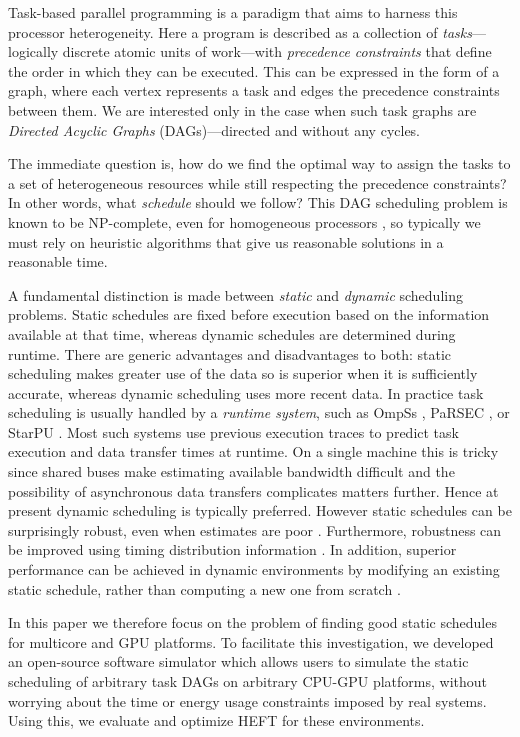 \documentclass[runningheads]{llncs}
\begin{document}
Task-based parallel programming is a paradigm that aims to harness this processor heterogeneity. Here a program is described as a collection of {\em tasks}---logically discrete atomic units of work---with {\em precedence constraints} that define the order in which they can be executed. This can be expressed in the form of a graph, where each vertex represents a task and edges the precedence constraints between them. We are interested only in the case when such task graphs are {\em Directed Acyclic Graphs} (DAGs)---directed and without any cycles.  

The immediate question is, how do we find the optimal way to assign the tasks to a set of heterogeneous resources while still respecting the precedence constraints? In other words, what {\em schedule} should we follow? This DAG scheduling problem is known to be NP-complete, even for homogeneous processors \cite{topcuoglu2002performance}, so typically we must rely on heuristic algorithms that give us reasonable solutions in a reasonable time.

A fundamental distinction is made between {\em static} and {\em dynamic} scheduling problems. Static schedules are fixed before execution based on the information available at that time, whereas dynamic schedules are determined during runtime. There are generic advantages and disadvantages to both: static scheduling makes greater use of the data so is superior when it is sufficiently accurate, whereas dynamic scheduling uses more recent data. In practice task scheduling is usually handled by a {\em runtime system}, such as OmpSs \cite{duran2011ompss}, PaRSEC \cite{bosilca2013parsec}, or StarPU \cite{augonnet2011starpu}. Most such systems use previous execution traces to predict task execution and data transfer times at runtime. On a single machine this is tricky since shared buses make estimating available bandwidth difficult and the possibility of asynchronous data transfers complicates matters further. Hence at present dynamic scheduling is typically preferred. However static schedules can be surprisingly robust, even when estimates are poor \cite{agullo2016}. Furthermore, robustness can be improved using timing distribution information \cite{ZHENG20131673}. In addition, superior performance can be achieved in dynamic environments by modifying an existing static schedule, rather than computing a new one from scratch \cite{agullo2016}. 

In this paper we therefore focus on the problem of finding good static schedules for multicore and GPU platforms. To facilitate this investigation, we developed an open-source software simulator which allows users to simulate the static scheduling of arbitrary task DAGs on arbitrary CPU-GPU platforms, without worrying about the time or energy usage constraints imposed by real systems. Using this, we evaluate and optimize HEFT for these environments.  
\end{document}
